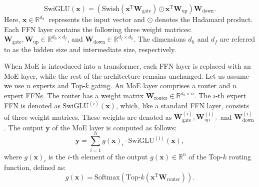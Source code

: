 \begin{equation}
\text{SwiGLU}(\mathbf{x}) = (\text{Swish}(\mathbf{x}^\mathrm{T} \mathbf{W}_\text{gate}) \odot \mathbf{x}^\mathrm{T} \mathbf{W}_\text{up}) \mathbf{W}_\text{down}.
\label{eq:ffn_swiglu}
\end{equation}
Here, $ \mathbf{x} \in \mathbb{R}^{d_h}\ $ represents the input vector and \(\odot\) denotes the Hadamard product. Each FFN layer contains the following three weight matrices: $
\mathbf{W}_\text{gate}, \mathbf{W}_\text{up} \in \mathbb{R}^{d_h \times d_f}$, and $\mathbf{W}_\text{down} \in \mathbb{R}^{d_f \times d_h}.
$
The dimensions \(d_h\) and \(d_f\) are referred to as the hidden size and intermediate size, respectively.

When MoE is introduced into a transformer, each FFN layer is replaced with an MoE layer, while the rest of the architecture remains unchanged. Let us assume we use \(n\) experts and Top-$k$ gating. 
An MoE layer comprises a router and \(n\) expert FFNs. The router has a weight matrix \(\mathbf{W}_\text{router} \in \mathbb{R}^{d_h \times n}\). The $i$-th expert FFN is denoted as \(\text{SwiGLU}^{(i)}(\mathbf{x})\), which, like a standard FFN layer, consists of three weight matrices. These weights are denoted as \(\mathbf{W}^{(i)}_\text{gate}, \mathbf{W}^{(i)}_\text{up},\) and \(\mathbf{W}^{(i)}_\text{down}\). 
%
The output \(\mathbf{y}\) of the MoE layer is computed as follows:
\begin{equation}
\mathbf{y} = \sum_{i=1}^{n} g(\mathbf{x})_i \cdot \text{SwiGLU}^{(i)}(\mathbf{x}),
\label{eq:moe_output}
\end{equation}
where \(g(\mathbf{x})_i\) is the $i$-th element of the output $g(\mathbf{x}) \in \mathbb{R}^n$ of the Top-$k$ routing function, defined as:
\begin{equation}
g(\mathbf{x}) = \text{Softmax}(\text{Top-}k(\mathbf{x}^\mathrm{T} \mathbf{W}_\text{router})).
\label{eq:gating_function}
\end{equation}


